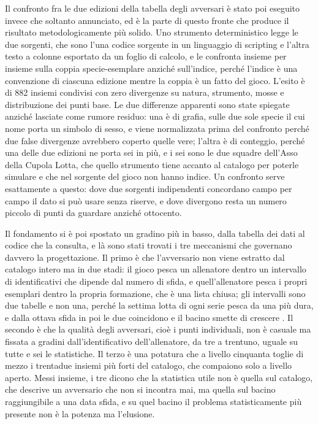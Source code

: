 Il confronto fra le due edizioni della tabella degli avversari è stato poi eseguito invece che soltanto annunciato, ed è la parte di questo fronte che produce il risultato metodologicamente più solido. Uno strumento deterministico legge le due sorgenti, che sono l'una codice sorgente in un linguaggio di scripting e l'altra testo a colonne esportato da un foglio di calcolo, e le confronta insieme per insieme sulla coppia specie-esemplare anziché sull'indice, perché l'indice è una convenzione di ciascuna edizione mentre la coppia è un fatto del gioco. L'esito è di 882 insiemi condivisi con zero divergenze su natura, strumento, mosse e distribuzione dei punti base. Le due differenze apparenti sono state spiegate anziché lasciate come rumore residuo: una è di grafia, sulle due sole specie il cui nome porta un simbolo di sesso, e viene normalizzata prima del confronto perché due false divergenze avrebbero coperto quelle vere; l'altra è di conteggio, perché una delle due edizioni ne porta sei in più, e i sei sono le due squadre dell'Asso della Cupola Lotta, che quello strumento tiene accanto al catalogo per poterle simulare e che nel sorgente del gioco non hanno indice. Un confronto serve esattamente a questo: dove due sorgenti indipendenti concordano campo per campo il dato si può usare senza riserve, e dove divergono resta un numero piccolo di punti da guardare anziché ottocento.

Il fondamento si è poi spostato un gradino più in basso, dalla tabella dei dati al codice che la consulta, e là sono stati trovati i tre meccanismi che governano davvero la progettazione. Il primo è che l'avversario non viene estratto dal catalogo intero ma in due stadi: il gioco pesca un allenatore dentro un intervallo di identificativi che dipende dal numero di sfida, e quell'allenatore pesca i propri esemplari dentro la propria formazione, che è una lista chiusa; gli intervalli sono due tabelle e non una, perché la settima lotta di ogni serie pesca da una più dura, e dalla ottava sfida in poi le due coincidono e il bacino smette di crescere \cite{pokeemerald}. Il secondo è che la qualità degli avversari, cioè i punti individuali, non è casuale ma fissata a gradini dall'identificativo dell'allenatore, da tre a trentuno, uguale su tutte e sei le statistiche. Il terzo è una potatura che a livello cinquanta toglie di mezzo i trentadue insiemi più forti del catalogo, che compaiono solo a livello aperto. Messi insieme, i tre dicono che la statistica utile non è quella sul catalogo, che descrive un avversario che non si incontra mai, ma quella sul bacino raggiungibile a una data sfida, e su quel bacino il problema statisticamente più presente non è la potenza ma l'elusione.

